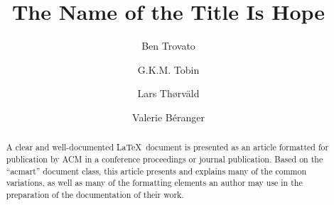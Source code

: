 \documentclass[manuscript,screen,review]{acmart}
\begin{document}
\title{The Name of the Title Is Hope}

\author{Ben Trovato}
\author{G.K.M. Tobin}
\authornotemark[1]

\author{Lars Th{\o}rv{\"a}ld}

\author{Valerie B\'eranger}

\renewcommand{\shortauthors}{Trovato et al.}

\begin{abstract}
  A clear and well-documented \LaTeX\ document is presented as an
  article formatted for publication by ACM in a conference proceedings
  or journal publication. Based on the ``acmart'' document class, this
  article presents and explains many of the common variations, as well
  as many of the formatting elements an author may use in the
  preparation of the documentation of their work.
\end{abstract}
\end{document}
